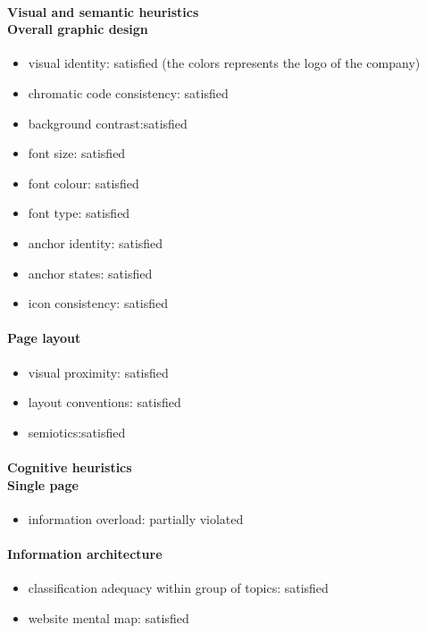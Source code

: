 \begin{enumerate}
	\paragraph*{Visual and semantic heuristics \\ Overall graphic design }
	\begin{itemize}
		\item visual identity: satisfied (the colors represents the logo of the company)
		\item chromatic code consistency: satisfied
		\item background contrast:satisfied
		\item font size: satisfied
		\item font colour: satisfied
		\item font type: satisfied
		\item anchor identity: satisfied
		\item anchor states: satisfied
		\item icon consistency: satisfied
	\end{itemize}

	\paragraph*{Page layout}
	\begin{itemize}
		\item visual proximity: satisfied
		\item layout conventions: satisfied
		\item semiotics:satisfied
	\end{itemize}

	\paragraph*{Cognitive heuristics \\ Single page}
	\begin{itemize}
		\item information overload: partially violated
	\end{itemize}	

	\paragraph*{Information architecture}
	\begin{itemize}
		\item classification adequacy within group of topics: satisfied
		\item website mental map: satisfied
	\end{itemize}
	\end{enumerate}